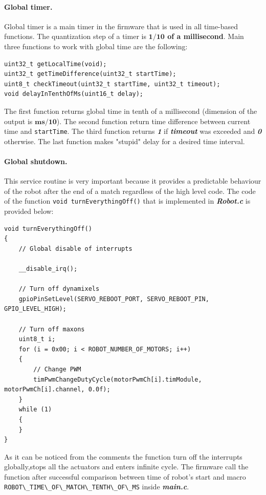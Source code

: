 \documentclass[a4paper,12pt]{article} %
\newcommand{\textitbf}[1]{\textbf{\textit{#1}}}
\newcommand{\inlinecode}[1]{\lstinline{#1}}
\begin{document}
\paragraph{Global timer.}
Global timer is a main timer in the firmware that is used in all time-based functions. The quantization step of a timer is \textbf{$\textbf{1/10}$ of a millisecond}. Main three functions to work with global time are the following:
\begin{lstlisting}
uint32_t getLocalTime(void);
uint32_t getTimeDifference(uint32_t startTime);
uint8_t checkTimeout(uint32_t startTime, uint32_t timeout);
void delayInTenthOfMs(uint16_t delay);
\end{lstlisting}
The first function returns global time in tenth of a millisecond (dimension of the output is $\textbf{ms/10}$). The second function return time difference between current time and \inlinecode{startTime}. The third function returns \textitbf{1} if \textitbf{timeout} was exceeded and \textitbf{0} otherwise. The last function makes "stupid" delay for a desired time interval.
 
\paragraph{Global shutdown.}
This service routine is very important because it provides a predictable behaviour of the robot after the end of a match regardless of the high level code. The code of the function \inlinecode{void turnEverythingOff()} that is implemented in \textitbf{Robot.c} is provided below:
\begin{lstlisting}
void turnEverythingOff()
{
	// Global disable of interrupts
	
	__disable_irq();

	// Turn off dynamixels
	gpioPinSetLevel(SERVO_REBOOT_PORT, SERVO_REBOOT_PIN, 				          GPIO_LEVEL_HIGH);
	
	// Turn off maxons
	uint8_t i;
	for (i = 0x00; i < ROBOT_NUMBER_OF_MOTORS; i++)
	{
		// Change PWM
		timPwmChangeDutyCycle(motorPwmCh[i].timModule, motorPwmCh[i].channel, 0.0f);
	}
	while (1)
	{
	}
} 

\end{lstlisting}
As it can be noticed from the comments the function  turn off the interrupts globally,stops all the actuators and enters infinite cycle. The firmware call the function after successful comparison between time of robot's start and macro \inlinecode{ROBOT\_TIME\_OF\_MATCH\_TENTH\_OF\_MS} inside \textitbf{main.c}.
\end{document}
